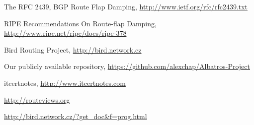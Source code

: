 \documentclass[a4paper,english]{IEEEtran}
\begin{document}
\begin{thebibliography}{6}

The RFC 2439, BGP Route Flap Damping, \href{http://www.ietf.org/rfc/rfc2439.txt}{http://www.ietf.org/rfc/rfc2439.txt}

 RIPE Recommendations On Route-flap
Damping, \href{http://www.ripe.net/ripe/docs/ripe-378}{http://www.ripe.net/ripe/docs/ripe-378}

Bird Routing Project, \href{http://bird.network.cz}{http://bird.network.cz}

Our publicly available repository, \href{https://github.com/alexchap/Albatros-Project}{https://github.com/alexchap/Albatros-Project}

itcertnotes, \href{www.itcertnotes.com}{http://www.itcertnotes.com}

\href{http://routeviews.org}{http://routeviews.org} 

\href{http://bird.network.cz/?get\_doc\&f=prog.html}{http://bird.network.cz/?get\_doc\&f=prog.html}

\end{thebibliography}
\end{document}
